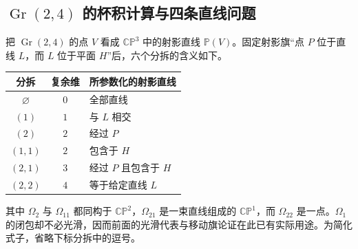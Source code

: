 \subsection{\texorpdfstring{\(\operatorname{Gr}(2,4)\) 的杯积计算与四条直线问题}{Gr(2,4) 的杯积计算与四条直线问题}}
\label{g2:subsec:2105:05}
把 \(\operatorname{Gr}(2,4)\) 的点 \(V\) 看成 \(\mathbb{CP}^3\) 中的射影直线 \(\mathbb P(V)\)。固定射影旗“点 \(P\) 位于直线 \(L\)，而 \(L\) 位于平面 \(H\)”后，六个分拆的含义如下。
\begin{center}
	\begin{tabular}{ccl}
		\hline
		分拆 & 复余维 & 所参数化的射影直线 \\
		\hline
		\(\varnothing\) & \(0\) & 全部直线 \\
		\((1)\) & \(1\) & 与 \(L\) 相交 \\
		\((2)\) & \(2\) & 经过 \(P\) \\
		\((1,1)\) & \(2\) & 包含于 \(H\) \\
		\((2,1)\) & \(3\) & 经过 \(P\) 且包含于 \(H\) \\
		\((2,2)\) & \(4\) & 等于给定直线 \(L\) \\
		\hline
	\end{tabular}
\end{center}
其中 \(\Omega_2\) 与 \(\Omega_{11}\) 都同构于 \(\mathbb{CP}^2\)，\(\Omega_{21}\) 是一束直线组成的 \(\mathbb{CP}^1\)，而 \(\Omega_{22}\) 是一点。\(\Omega_1\) 的闭包却不必光滑，因而前面的光滑代表与移动旗论证在此已有实际用途。为简化式子，省略下标分拆中的逗号。

